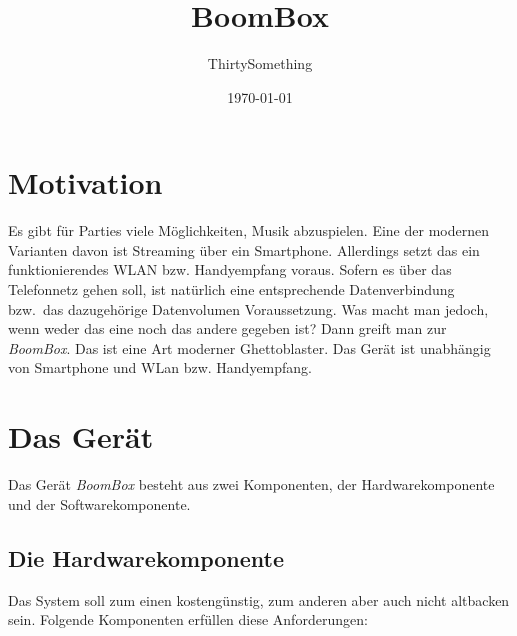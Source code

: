 \documentclass[12pt,a4paper]{article}
\author{ThirtySomething}
\title{BoomBox}
\date{\today}
\newcommand{\bb}{\textit{BoomBox}}
\begin{document}
\clearpage\maketitle
\thispagestyle{empty}
\newpage

\tableofcontents
{}
\newpage


\section{Motivation}
Es gibt für Parties viele Möglichkeiten, Musik abzuspielen. Eine der modernen Varianten davon ist Streaming über ein Smartphone. Allerdings setzt das
ein funktionierendes WLAN bzw. Handyempfang voraus. Sofern es über das Telefonnetz gehen soll, ist natürlich eine entsprechende Datenverbindung bzw.~das
dazugehörige Datenvolumen Voraussetzung. Was macht man jedoch, wenn weder das eine noch das andere gegeben ist? Dann greift man zur \bb{}.
Das ist eine Art moderner Ghettoblaster. Das Gerät ist unabhängig von Smartphone und WLan bzw. Handyempfang.

\newpage
\section{Das Gerät}
Das Gerät \bb{} besteht aus zwei Komponenten, der Hardwarekomponente und der Softwarekomponente.

\subsection{Die Hardwarekomponente}
Das System soll zum einen kostengünstig, zum anderen aber auch nicht altbacken sein. Folgende Komponenten erfüllen diese Anforderungen:
\end{document}
